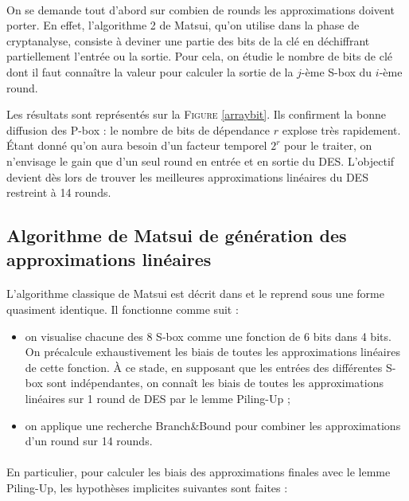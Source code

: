 \documentclass{scrartcl}
\begin{document}
\paragraph*{}
On se demande tout d'abord sur combien de rounds les approximations doivent porter. En effet, l'algorithme 2 de Matsui, qu'on utilise dans
la phase de cryptanalyse, consiste à deviner une partie des bits de la clé en déchiffrant partiellement l'entrée ou la sortie. Pour cela,
on étudie le nombre de bits de clé dont il faut connaître la valeur pour calculer la sortie de la $j$-ème S-box du $i$-ème round.

Les résultats sont représentés sur la \textsc{Figure} \ref{arraybit}. Ils confirment la bonne diffusion des P-box : le nombre de bits
de dépendance $r$ explose très rapidement. Étant donné qu'on aura besoin d'un facteur temporel $2^r$ pour le traiter, on n'envisage 
le gain que d'un seul round en entrée et en sortie du DES. L'objectif devient dès lors de trouver les meilleures approximations linéaires
du DES restreint à 14 rounds.


\subsection{Algorithme de Matsui de génération des approximations linéaires}

\paragraph*{}
L'algorithme classique de Matsui est décrit dans \cite{Matsui1995} et \cite{Biryukov2004} le reprend sous
une forme quasiment identique. Il fonctionne comme suit :


\begin{itemize}
	\item on visualise chacune des 8 S-box comme une fonction de 6 bits dans 4 bits. On précalcule exhaustivement les
	biais de toutes les approximations linéaires de cette fonction. À ce stade, en supposant que les entrées des
	différentes S-box sont indépendantes, on connaît les biais de toutes les approximations linéaires sur 1 round de DES
	par le lemme Piling-Up ;
	\item on applique une recherche Branch\&Bound pour combiner les approximations d'un round sur 14 rounds.
\end{itemize}

\paragraph*{}
En particulier, pour calculer les biais des approximations finales avec le lemme Piling-Up, les hypothèses implicites suivantes sont faites :
\end{document}
